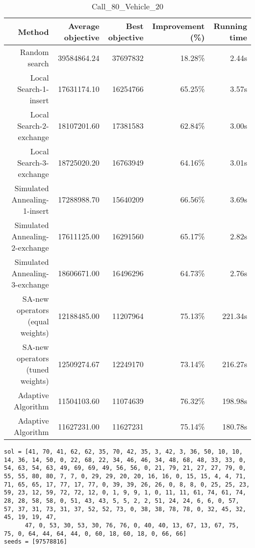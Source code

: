\begin{table}[ht]
\centering
\caption{Call\_80\_Vehicle\_20}
\label{tab:call80vehicle20}
\begin{tabular}{|r|r|r|r|r|}
Method & Average objective & Best objective & Improvement (\%) & Running time \\
\hline
Random search & 39584864.24 & 37697832 & 18.28\% & 2.44s\\
Local Search-1-insert & 17631174.10 & 16254766 & 65.25\% & 3.57s\\
Local Search-2-exchange & 18107201.60 & 17381583 & 62.84\% & 3.00s\\
Local Search-3-exchange & 18725020.20 & 16763949 & 64.16\% & 3.01s\\
Simulated Annealing-1-insert & 17288988.70 & 15640209 & 66.56\% & 3.69s\\
Simulated Annealing-2-exchange & 17611125.00 & 16291560 & 65.17\% & 2.82s\\
Simulated Annealing-3-exchange & 18606671.00 & 16496296 & 64.73\% & 2.76s\\
SA-new operators (equal weights) & 12188485.00 & 11207964 & 75.13\% & 221.34s\\
SA-new operators (tuned weights) & 12509274.67 & 12249170 & 73.14\% & 216.27s\\
Adaptive Algorithm & 11504103.60 & 11074639 & 76.32\% & 198.98s\\
Adaptive Algorithm & 11627231.00 & 11627231 & 75.14\% & 180.78s\\
\end{tabular}%
\end{table}
\begin{lstlisting}[label={lst:call80vehicle20},caption=Optimal solution call\_80\_vehicle\_20]
sol = [41, 70, 41, 62, 62, 35, 70, 42, 35, 3, 42, 3, 36, 50, 10, 10, 14, 36, 14, 50, 0, 22, 68, 22, 34, 46, 46, 34, 48, 68, 48, 33, 33, 0, 54, 63, 54, 63, 49, 69, 69, 49, 56, 56, 0, 21, 79, 21, 27, 27, 79, 0, 55, 55, 80, 80, 7, 7, 0, 29, 29, 20, 20, 16, 16, 0, 15, 15, 4, 4, 71, 71, 65, 65, 17, 77, 17, 77, 0, 39, 39, 26, 26, 0, 8, 8, 0, 25, 25, 23, 59, 23, 12, 59, 72, 72, 12, 0, 1, 9, 9, 1, 0, 11, 11, 61, 74, 61, 74, 28, 28, 58, 58, 0, 51, 43, 43, 5, 5, 2, 2, 51, 24, 24, 6, 6, 0, 57, 57, 37, 31, 73, 31, 37, 52, 52, 73, 0, 38, 38, 78, 78, 0, 32, 45, 32, 45, 19, 19, 47,
      47, 0, 53, 30, 53, 30, 76, 76, 0, 40, 40, 13, 67, 13, 67, 75, 75, 0, 64, 44, 64, 44, 0, 60, 18, 60, 18, 0, 66, 66]
seeds = [97578816]
\end{lstlisting}%
\clearpage


